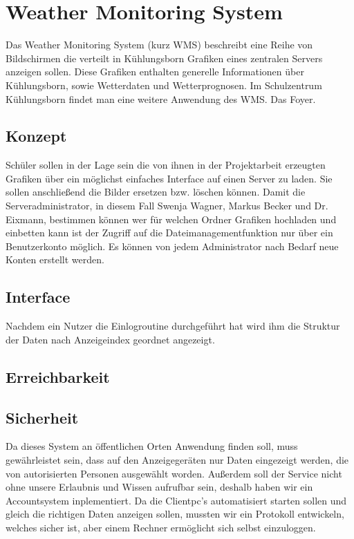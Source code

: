 \documentclass[a4paper,oneside,10pt,titlepage]{article}
\begin{document}
\section{Weather Monitoring System}
Das Weather Monitoring System (kurz WMS) beschreibt eine Reihe von Bildschirmen die verteilt in Kühlungsborn Grafiken eines zentralen Servers anzeigen sollen. Diese Grafiken enthalten generelle Informationen über Kühlungsborn, sowie Wetterdaten und Wetterprognosen. Im Schulzentrum Kühlungsborn findet man eine weitere Anwendung des WMS. Das Foyer.
\subsection{Konzept}
Schüler sollen in der Lage sein die von ihnen in der Projektarbeit erzeugten Grafiken über ein möglichst einfaches Interface auf einen Server zu laden. Sie sollen anschließend die Bilder ersetzen bzw. löschen können. Damit die Serveradministrator, in diesem Fall Swenja Wagner, Markus Becker und Dr. Eixmann, bestimmen können wer für welchen Ordner Grafiken hochladen und einbetten kann ist der Zugriff auf die Dateimanagementfunktion nur über ein Benutzerkonto möglich. Es können von jedem Administrator nach Bedarf neue Konten erstellt werden.
\subsection{Interface}
Nachdem ein Nutzer die Einlogroutine durchgeführt hat wird ihm die Struktur der Daten nach Anzeigeindex geordnet angezeigt.
\subsection{Erreichbarkeit}
\subsection{Sicherheit}
Da dieses System an öffentlichen Orten Anwendung finden soll, muss gewährleistet sein, dass auf den Anzeigegeräten nur Daten eingezeigt werden, die von autorisierten Personen ausgewählt worden. Außerdem soll der Service nicht ohne unsere Erlaubnis und Wissen aufrufbar sein, deshalb haben wir ein Accountsystem inplementiert. Da die Clientpc's automatisiert starten sollen und gleich die richtigen Daten anzeigen sollen, mussten wir ein Protokoll entwickeln, welches sicher ist, aber einem Rechner ermöglicht sich selbst einzuloggen.
\end{document}
